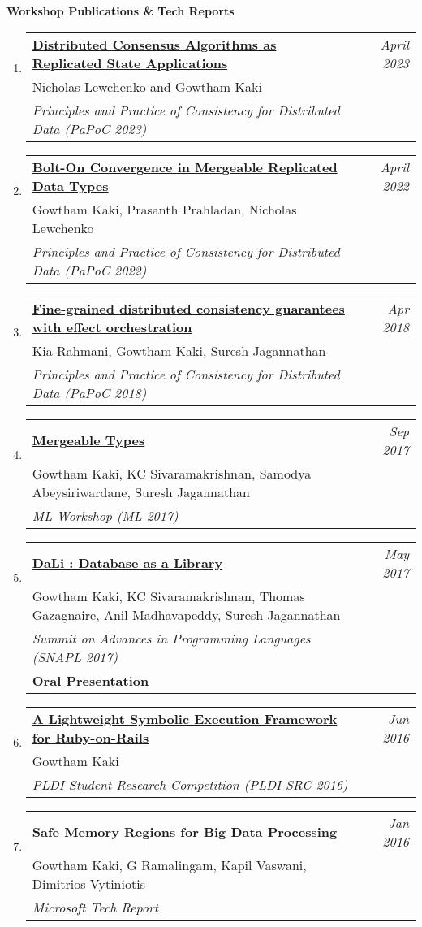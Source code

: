 \documentclass[10pt]{article}
\makeatletter
\newcommand{\lbar}[1]{{\color{#1}\ding{118}}\hspace*{2pt}}
\newenvironment{benumerate}[2]{
    \let\oldItem\item
    \def\item{\addtocounter{enumi}{-2}\oldItem}
    \begin{enumerate}[#2] \itemsep3pt
    \setcounter{enumi}{#1}
    \addtocounter{enumi}{1}}
  {\end{enumerate}}
\newenvironment{publication}[5]
{ \item
  \begin{tabular*}{7.5in}{p{6.3in}@{\extracolsep{\fill}}r}
    \href{#1}{\textbf{#2}} & \textit{#3}\\ #4 &\\ \textit{#5}&\\
  \end{tabular*}
} {}
\newenvironment{publicationNote}[6]
{ \item
  \begin{tabular*}{7.5in}{p{6.3in}@{\extracolsep{\fill}}r}
    \href{#1}{\textbf{#2}} & \textit{#3}\\ #4 &\\ \textit{#5}\\ \textbf{#6} \\
  \end{tabular*}
} {}
\newenvironment{region}[3]{%
  \vspace*{0.5ex}
  {{\textbf{\large{#1}}}}
  \begin{benumerate}{#3}{\color{RoyalBlue}#2}}
  {\end{benumerate}\vspace{0.8ex}}
\makeatother
\begin{document}
\begin{region} {\lbar{Mahogany}Workshop Publications \& Tech Reports}{{W}1}{5}

  \begin{publication} {https://gowthamk.github.io/docs/papoc22.pdf}
		{Distributed Consensus Algorithms as Replicated State Applications }
		{April 2023} {Nicholas Lewchenko and Gowtham Kaki}
		{Principles and Practice of Consistency for Distributed Data
    (PaPoC 2023)}
  \end{publication}

  \begin{publication} {https://gowthamk.github.io/docs/papoc23.pdf}
		{Bolt-On Convergence in Mergeable Replicated Data Types}
		{April 2022} {Gowtham Kaki, Prasanth Prahladan, Nicholas Lewchenko}
		{Principles and Practice of Consistency for Distributed Data
    (PaPoC 2022)}
  \end{publication}

	\begin{publication}{https://gowthamk.github.io/docs/papoc18.pdf}
		{Fine-grained distributed consistency guarantees with effect orchestration}
		{Apr 2018}{Kia Rahmani, Gowtham Kaki, Suresh Jagannathan}
    {Principles and Practice of Consistency for Distributed Data (PaPoC 2018)}
  \end{publication}

  \begin{publication}{http://kcsrk.info/papers/mergeable_types_ml17.pdf}
    {Mergeable Types}
    {Sep 2017}{Gowtham Kaki, KC Sivaramakrishnan, Samodya Abeysiriwardane, Suresh Jagannathan}
    {ML Workshop (ML 2017)}
  \end{publication}

	\begin{publicationNote} {http://kcsrk.info/papers/dali_snapl17.pdf}
    {DaLi : Database as a Library}
    {May 2017} {Gowtham Kaki, KC Sivaramakrishnan, Thomas Gazagnaire, Anil Madhavapeddy, Suresh Jagannathan}
    {Summit on Advances in Programming Languages (SNAPL 2017)}
    {Oral Presentation}
  \end{publicationNote}

  \begin{publication}{http://purduepl.github.io/docs/maglev.pdf}
    {A Lightweight Symbolic Execution Framework for Ruby-on-Rails}
    {Jun 2016}{Gowtham Kaki} {PLDI Student Research Competition (PLDI SRC 2016)}
  \end{publication}

  \begin{publication}{https://www.microsoft.com/en-us/research/publication/safe-memory-regions-big-data-processing}
    {Safe Memory Regions for Big Data Processing}
    {Jan 2016}{Gowtham Kaki, G Ramalingam, Kapil Vaswani, Dimitrios
    Vytiniotis} {Microsoft Tech Report}
  \end{publication}

\end{region}
\end{document}

